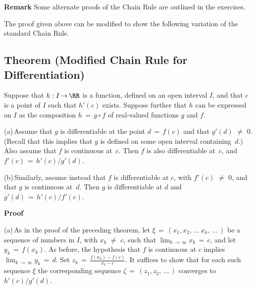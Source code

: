 \V

        {\bf Remark} Some alternate proofs of the Chain Rule are outlined in the exercises.


\VV

        

        The proof given above can be modified to show the following variation of the standard Chain Rule.


\VV


            \subsection{\small{\bf Theorem} (Modified Chain Rule for Differentiation)}
            \label{ThmE30.75}

\V

        Suppose that $h:I \,{\rightarrow}\, {\RR}$ is a function, defined on an open interval $I$, and that $c$ is a point of $I$ such that $h'(c)$ exists.
    Suppose further that $h$ can be expressed on $I$ as the composition $h \,=\, g{\circ}f$ of real-valued functions $g$ and $f$.

\V

    (a)\,Assume that $g$ is differentiable at the point $d \,=\, f(c)$ and that $g'(d) \,\,{\neq}\,\, 0$.
    (Recall that this implies that $g$ is defined on some open interval containing~$d$.)
    Also assume that $f$ is continuous at~$c$. Then $f$ is also differentiable at~$c$, and $f'(c) \,=\, h'(c)/g'(d)$.

\V

        (b)\,Similarly, assume instead that $f$ is differentiable at $c$, with $f'(c) \,\,{\neq}\,\, 0$, and that $g$ is continuous at~$d$.
    Then $g$ is differentiable at $d$ and $g'(d) \,=\, h'(c)/f'(c)$.

\V

        {\bf Proof} 

\V

         (a)\,As in the proof of the preceding theorem, let ${\xi} \,=\, (x_{1},x_{2},\,{\ldots}\,x_{k},\,{\ldots}\,)$
    be a sequence of numbers in $I$, with $x_{k} \,\,{\neq}\,\, c$, such that ${\displaystyle \lim_{k \,{\rightarrow}\, {\infty}} x_{k} \,=\, c}$,
    and let $y_{k} \,=\, f(x_{k})$. As before, the hypothesis that $f$ is continuous at $c$ implies $\lim_{k \,{\rightarrow}\, {\infty}} y_{k} \,=\, d$.
    Set ${\displaystyle z_{k} \,=\, \frac{f(x_{k}) - f(c)}{x_{k} - c}}$. It suffices to show that for each such sequence ${\xi}$
    the corresponding sequence ${\zeta} \,=\, (z_{1}, z_{2},\,{\ldots}\,)$ converges to~$h'(c)/g'(d)$.

